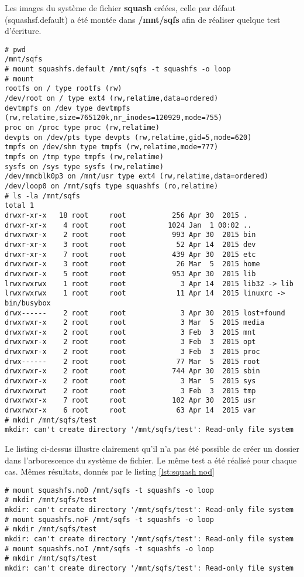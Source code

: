 Les images du système de fichier \textbf{squash} créées, celle par défaut (squashsf.default) a été montée dans \textbf{/mnt/sqfs} afin de réaliser quelque test d'écriture.
\begin{lstlisting}[style=Bash]
# pwd
/mnt/sqfs
# mount squashfs.default /mnt/sqfs -t squashfs -o loop
# mount
rootfs on / type rootfs (rw)
/dev/root on / type ext4 (rw,relatime,data=ordered)
devtmpfs on /dev type devtmpfs (rw,relatime,size=765120k,nr_inodes=120929,mode=755)
proc on /proc type proc (rw,relatime)
devpts on /dev/pts type devpts (rw,relatime,gid=5,mode=620)
tmpfs on /dev/shm type tmpfs (rw,relatime,mode=777)
tmpfs on /tmp type tmpfs (rw,relatime)
sysfs on /sys type sysfs (rw,relatime)
/dev/mmcblk0p3 on /mnt/usr type ext4 (rw,relatime,data=ordered)
/dev/loop0 on /mnt/sqfs type squashfs (ro,relatime)
# ls -la /mnt/sqfs
total 1
drwxr-xr-x   18 root     root           256 Apr 30  2015 .
drwxr-xr-x    4 root     root          1024 Jan  1 00:02 ..
drwxrwxr-x    2 root     root           993 Apr 30  2015 bin
drwxr-xr-x    3 root     root            52 Apr 14  2015 dev
drwxr-xr-x    7 root     root           439 Apr 30  2015 etc
drwxrwxr-x    3 root     root            26 Mar  5  2015 home
drwxrwxr-x    5 root     root           953 Apr 30  2015 lib
lrwxrwxrwx    1 root     root             3 Apr 14  2015 lib32 -> lib
lrwxrwxrwx    1 root     root            11 Apr 14  2015 linuxrc -> bin/busybox
drwx------    2 root     root             3 Apr 30  2015 lost+found
drwxrwxr-x    2 root     root             3 Mar  5  2015 media
drwxrwxr-x    2 root     root             3 Feb  3  2015 mnt
drwxrwxr-x    2 root     root             3 Feb  3  2015 opt
drwxrwxr-x    2 root     root             3 Feb  3  2015 proc
drwx------    2 root     root            77 Mar  5  2015 root
drwxrwxr-x    2 root     root           744 Apr 30  2015 sbin
drwxrwxr-x    2 root     root             3 Mar  5  2015 sys
drwxrwxrwt    2 root     root             3 Feb  3  2015 tmp
drwxrwxr-x    7 root     root           102 Apr 30  2015 usr
drwxrwxr-x    6 root     root            63 Apr 14  2015 var
# mkdir /mnt/sqfs/test
mkdir: can't create directory '/mnt/sqfs/test': Read-only file system
\end{lstlisting}

Le listing ci-dessus illustre clairement qu'il n'a pas été possible de créer un dossier dans l'arborescence du système de fichier. Le même test a été réalisé pour chaque cas. Mêmes résultats, donnés par le listing \ref{lst:squash nod}

\begin{lstlisting}[style=Bash,caption=squashfs.noD,label=squash nod]
# mount squashfs.noD /mnt/sqfs -t squashfs -o loop
# mkdir /mnt/sqfs/test
mkdir: can't create directory '/mnt/sqfs/test': Read-only file system
# mount squashfs.noF /mnt/sqfs -t squashfs -o loop
# mkdir /mnt/sqfs/test
mkdir: can't create directory '/mnt/sqfs/test': Read-only file system
# mount squashfs.noI /mnt/sqfs -t squashfs -o loop
# mkdir /mnt/sqfs/test
mkdir: can't create directory '/mnt/sqfs/test': Read-only file system
\end{lstlisting}


